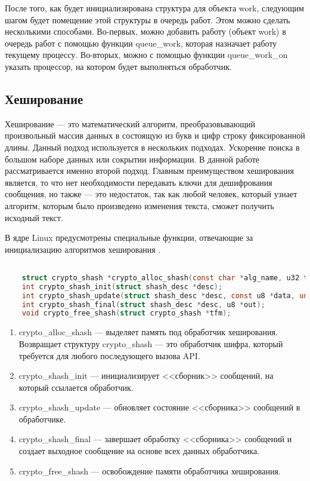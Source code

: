 После того, как будет инициализирована структура для объекта work, следующим шагом будет помещение этой структуры в очередь работ.
Этом можно сделать несколькими способами. 
Во-первых, можно добавить работу (объект work) в очередь работ с помощью функции queue\_work,
которая назначает работу текущему процессу.
Во-вторых, можно с помощью функции queue\_work\_on указать процессор, на котором будет выполняться обработчик.

\subsection{Хеширование}

Хеширование --- это математический алгоритм, преобразовывающий произвольный массив данных в состоящую из букв и цифр строку фиксированной длины.
Данный подход используется в нескольких подходах. 
Ускорение поиска в большом наборе данных или сокрытии информации.
В данной работе рассматривается именно второй подход.
Главным преимуществом хеширования является, то что нет необходимости передавать ключи для дешифрования сообщения,
но также --- это недостаток, так как любой человек, который узнает алгоритм, которым было произведено изменения текста, сможет получить исходный текст.

В ядре Linux предусмотрены специальные функции, отвечающие за инициализацию алгоритмов хеширования \cite{hasg}.

\begin{lstlisting}[language=c, label=cringe, caption=Функции алгоритмов хеширования.]

    struct crypto_shash *crypto_alloc_shash(const char *alg_name, u32 type, u32 mask);
    int crypto_shash_init(struct shash_desc *desc);
    int crypto_shash_update(struct shash_desc *desc, const u8 *data, unsigned int len);
    int crypto_shash_final(struct shash_desc *desc, u8 *out);
    void crypto_free_shash(struct crypto_shash *tfm);

\end{lstlisting}

\begin{enumerate}
    \item crypto\_alloc\_shash --- выделяет память под обработчик хеширования. 
    Возвращает структуру crypto\_shash --- это обработчик шифра, который требуется для любого последующего вызова API.
    \item crypto\_shash\_init --- инициализирует <<сборник>> сообщений, на который ссылается обработчик.
    \item crypto\_shash\_update --- обновляет состояние <<сборника>> сообщений в обработчике.
    \item crypto\_shash\_final --- завершает обработку <<сборника>> сообщений и создает выходное сообщение на основе всех данных обработчика.
    \item crypto\_free\_shash --- освобождение памяти обработчика хеширования.
\end{enumerate}

